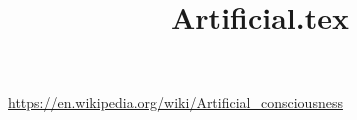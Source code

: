 \documentclass[a4paper]{article}
\title{Artificial.tex}
\date{}
\begin{document}
    \maketitle
    \url{https://en.wikipedia.org/wiki/Artificial_consciousness}
\end{document}
